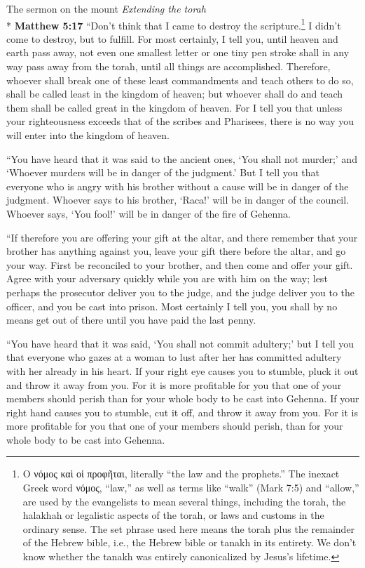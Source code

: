 \documentclass[10pt,a5paper,twoside]{article}
\newcommand{\quotesize}{\normalsize{}}
\newenvironment{quotetext}{\begingroup\quotesize}{\endgroup}
\newcommand{\intex}[1]{\index[texts]{#1}}
\newcommand{\bible}[2]{\begin{quotetext}\textbf{#1}\intex{#1} #2\end{quotetext}}
\newcommand{\matthew}[2]{\bible{Matthew #1}{#2}}
\newcommand{\subhead}[1]{\emph{#1}\\*}
\begin{document}
\begin{section}{The sermon on the mount}
\subhead{Extending the torah}
\matthew{5:17}{
``Don't think that I came to destroy the scripture.\footnote{Ο νόμος καὶ οἱ προφῆται, literally ``the law and the prophets.''
The inexact Greek word νόμος, ``law,'' as well as terms like ``walk'' (Mark 7:5) and ``allow,'' are used by the evangelists
to mean several things, including the torah, the halakhah or legalistic aspects of the torah, or laws and customs in the ordinary
sense. The set phrase used here means the torah plus the remainder
of the Hebrew bible, i.e., the Hebrew bible or tanakh in its entirety. We don't know whether the tanakh was
entirely canonicalized by Jesus's lifetime.} I didn't come to destroy, but to fulfill.    For most certainly, I tell you, until heaven and earth pass away, not even one smallest letter or one tiny pen stroke shall in any way pass away from the torah, until all things are accomplished.    Therefore, whoever shall break one of these least commandments and teach others to do so, shall be called least in the kingdom of heaven; but whoever shall do and teach them shall be called great in the kingdom of heaven.    For I tell you that unless your righteousness exceeds that of the scribes and Pharisees, there is no way you will enter into the kingdom of heaven.

   ``You have heard that it was said to the ancient ones, `You shall not murder;' and `Whoever murders will be in danger of the judgment.'    But I tell you that everyone who is angry with his brother without a cause  will be in danger of the judgment. Whoever says to his brother, `Raca!' will be in danger of the council. Whoever says, `You fool!' will be in danger of the fire of Gehenna.

   ``If therefore you are offering your gift at the altar, and there remember that your brother has anything against you,    leave your gift there before the altar, and go your way. First be reconciled to your brother, and then come and offer your gift.    Agree with your adversary quickly while you are with him on the way; lest perhaps the prosecutor deliver you to the judge, and the judge deliver you to the officer, and you be cast into prison.    Most certainly I tell you, you shall by no means get out of there until you have paid the last penny.

   ``You have heard that it was said,  `You shall not commit adultery;'    but I tell you that everyone who gazes at a woman to lust after her has committed adultery with her already in his heart.    If your right eye causes you to stumble, pluck it out and throw it away from you. For it is more profitable for you that one of your members should perish than for your whole body to be cast into Gehenna.    If your right hand causes you to stumble, cut it off, and throw it away from you. For it is more profitable for you that one of your members should perish, than for your whole body to be cast into Gehenna.

}
\end{section}
\end{document}
